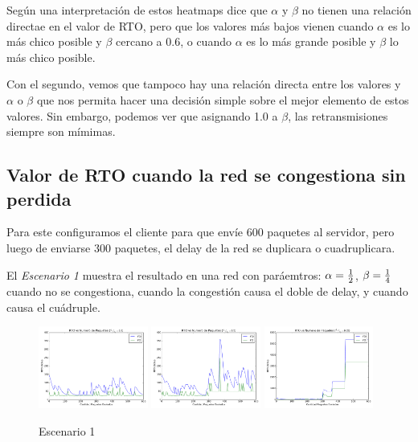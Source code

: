	Seg\'un una interpretaci\'on de estos heatmaps dice que $\alpha$ y $\beta$
	no tienen una relaci\'on directae en el valor de RTO, pero que los valores
	m\'as bajos vienen cuando $\alpha$ es lo m\'as chico posible y $\beta$
	cercano a $0.6$, o cuando $\alpha$ es lo m\'as grande posible y $\beta$ lo
	m\'as chico posible.

	Con el segundo, vemos que tampoco hay una relaci\'on directa entre los
	valores y $\alpha$ o $\beta$ que nos permita hacer una decisi\'on simple
	sobre el mejor elemento de estos valores. Sin embargo, podemos ver que
	asignando 1.0 a $\beta$, las retransmisiones siempre son m\'imimas.

	\newpage
    \subsection{Valor de RTO cuando la red se congestiona sin perdida}
        Para este configuramos el cliente para que env\'ie 600 paquetes al
        servidor, pero luego de enviarse 300 paquetes, el delay de la red
        se duplicara o cuadruplicara.

        El \emph{Escenario 1} muestra el resultado en una red con
        par\'aemtros: $\alpha={{1}\over{2}}$, $\beta={{1}\over{4}}$
        cuando no se congestiona, cuando la congesti\'on causa el doble de
        delay, y cuando causa el cu\'adruple.

        \begin{figure}[H]
            \center

		    \includegraphics[width=0.32\textwidth]{imagenes/congestion_1.pdf}
		    \includegraphics[width=0.32\textwidth]{imagenes/congestion_2.pdf}
		    \includegraphics[width=0.32\textwidth]{imagenes/congestion_4.pdf}

            \caption*{Escenario 1}

        \end{figure}

